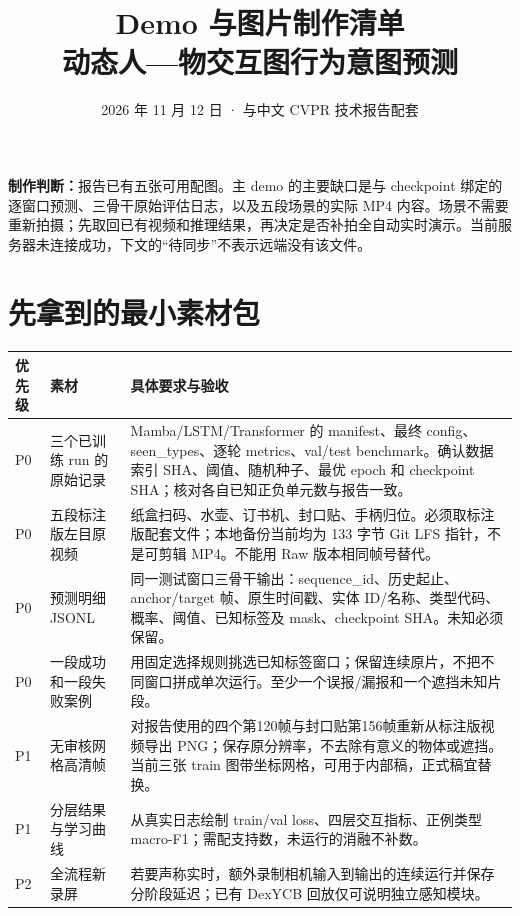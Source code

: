 \documentclass[11pt,a4paper]{ctexart}
\title{Demo 与图片制作清单\\\large 动态人—物交互图行为意图预测}
\author{2026 年 11 月 12 日 · 与中文 CVPR 技术报告配套}
\date{}
\begin{document}
\maketitle
\textbf{制作判断：}报告已有五张可用配图。主 demo 的主要缺口是与 checkpoint 绑定的逐窗口预测、三骨干原始评估日志，以及五段场景的实际 MP4 内容。场景不需要重新拍摄；先取回已有视频和推理结果，再决定是否补拍全自动实时演示。当前服务器未连接成功，下文的“待同步”不表示远端没有该文件。

\section{先拿到的最小素材包}
\begin{longtable}{L{1.1cm}L{4.1cm}L{9.1cm}}
\toprule 优先级 & 素材 & 具体要求与验收\\\midrule\endhead
P0 & 三个已训练 run 的原始记录 & Mamba/LSTM/Transformer 的 manifest、最终 config、seen\_types、逐轮 metrics、val/test benchmark。确认数据索引 SHA、阈值、随机种子、最优 epoch 和 checkpoint SHA；核对各自已知正负单元数与报告一致。\\
P0 & 五段标注版左目原视频 & 纸盒扫码、水壶、订书机、封口贴、手柄归位。必须取标注版配套文件；本地备份当前均为 133 字节 Git LFS 指针，不是可剪辑 MP4。不能用 Raw 版本相同帧号替代。\\
P0 & 预测明细 JSONL & 同一测试窗口三骨干输出：sequence\_id、历史起止、anchor/target 帧、原生时间戳、实体 ID/名称、类型代码、概率、阈值、已知标签及 mask、checkpoint SHA。未知必须保留。\\
P0 & 一段成功和一段失败案例 & 用固定选择规则挑选已知标签窗口；保留连续原片，不把不同窗口拼成单次运行。至少一个误报/漏报和一个遮挡未知片段。\\
P1 & 无审核网格高清帧 & 对报告使用的四个第120帧与封口贴第156帧重新从标注版视频导出 PNG；保存原分辨率，不去除有意义的物体或遮挡。当前三张 train 图带坐标网格，可用于内部稿，正式稿宜替换。\\
P1 & 分层结果与学习曲线 & 从真实日志绘制 train/val loss、四层交互指标、正例类型 macro-F1；需配支持数，未运行的消融不补数。\\
P2 & 全流程新录屏 & 若要声称实时，额外录制相机输入到输出的连续运行并保存分阶段延迟；已有 DexYCB 回放仅可说明独立感知模块。\\
\bottomrule
\end{longtable}
\end{document}

